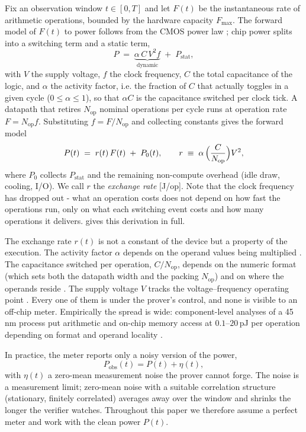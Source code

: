 \documentclass{article}
\theoremstyle{plain}
\theoremstyle{definition}
\theoremstyle{remark}
\begin{document}
Fix an observation window $t \in [0,T]$ and let $F(t)$ be the instantaneous
rate of arithmetic operations, bounded by the hardware capacity
$F_{\max}$. The forward model of $F(t)$ to power follows from the CMOS power law
\citep{chandrakasan1992lowpower}; chip power splits into a switching term and
a static term,
\begin{equation}
	P \;=\; \underbrace{\alpha\,C\,V^2 f}_{\text{dynamic}} \;+\; P_{\mathrm{stat}},
	\label{eq:cmoslaw}
\end{equation}
with $V$ the supply voltage, $f$ the clock frequency, $C$ the total capacitance of
the logic, and $\alpha$ the activity factor, i.e. the fraction of $C$ that
actually toggles in a given cycle ($0 \le \alpha \le 1$), so that
$\alpha C$ is the capacitance switched per clock tick. A datapath that retires $N_{\mathrm{op}}$
nominal operations per cycle runs at operation rate $F = N_{\mathrm{op}}f$.
Substituting $f = F/N_{\mathrm{op}}$ and collecting constants gives the
forward model
\begin{equation}
	P(t) \;=\; r(t)\,F(t) \;+\; P_0(t), \qquad
	r \;\equiv\; \alpha\,\Bigl(\frac{C}{N_{\mathrm{op}}}\Bigr) V^2 ,
	\label{eq:forward}
\end{equation}
where $P_0$ collects $P_{\mathrm{stat}}$ and the remaining non-compute
overhead (idle draw, cooling, I/O). We call $r$ the \emph{exchange rate}
[J/op]. Note that the clock frequency
has dropped out - what an operation costs does not depend on
how fast the operations run, only on what each switching event costs and how
many operations it delivers.  gives this derivation in full.

The exchange rate $r(t)$ is not a constant of the device but a property of the
execution. The activity factor $\alpha$ depends on the operand values being
multiplied \citep{chandrakasan1992lowpower}. The capacitance switched per operation,
$C/N_{\mathrm{op}}$, depends on the numeric format (which sets both the
datapath width and the packing $N_{\mathrm{op}}$) and on where the operands
reside \citep{horowitz2014computing}. The supply voltage $V$ tracks the
voltage--frequency operating point \citep{pallipadi2006ondemand}. Every one
of them is under the prover's control, and none is visible to an off-chip
meter. Empirically the spread is wide: component-level analyses of a 45\,nm
process put arithmetic and on-chip memory access at $0.1$--$20$\,pJ per
operation depending on format and operand locality
\citep{horowitz2014computing}. 

In practice, the meter reports only a noisy version of the power,
\begin{equation}
	P_{\mathrm{obs}}(t) = P(t) + \eta(t),
	\label{eq:obs}
\end{equation}
with $\eta(t)$ a zero-mean measurement noise the prover cannot forge. The
noise is a measurement limit; zero-mean noise with a suitable correlation
structure (stationary, finitely correlated) averages away over
the window and shrinks the longer the verifier watches. Throughout this paper
we therefore assume a perfect meter and work with the clean power $P(t)$.
\end{document}
